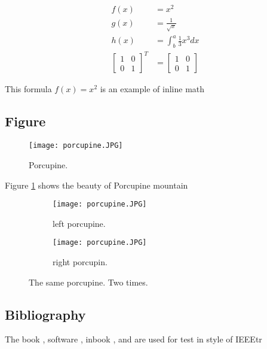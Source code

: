 \documentclass{article}
\begin{document}
\begin{align*}
    f(x) &= x^2 \\
    g(x) &= \frac{1}{\sqrt{x}} \\
    h(x) &= \int^a_b \frac{1}{3}x^3dx \\
    \left[\begin{matrix}
        1 & 0 \\
        0 & 1
    \end{matrix}\right]^T & =
    \left[\begin{matrix}
            1 & 0 \\
            0 & 1
          \end{matrix}\right]
\end{align*}

This formula $f(x) = x^2$ is an example of inline math


\subsection{Figure}
\begin{figure}
   \texttt{[image: porcupine.JPG]} 
   \caption{Porcupine.}
   \label{fig:porcupine}
\end{figure}
Figure \ref{fig:porcupine} shows the beauty of Porcupine mountain


\begin{figure}
    \centering
    \begin{subfigure}[b]{0.45\linewidth}
        \texttt{[image: porcupine.JPG]}
        \caption{left porcupine.}
    \end{subfigure}
    \begin{subfigure}[b]{0.45\linewidth}
        \texttt{[image: porcupine.JPG]}
        \caption{right porcupin.}
    \end{subfigure}
    \caption{The same porcupine. Two times.}
    \label{fig:subpocupine}
\end{figure}

\subsection{Bibliography}

The book \cite{DUMMY:1}, software \cite{Software:1}, inbook \cite{BOOK:2}, and
\cite{ARTICLE:1} are used for test in style of IEEEtr

\end{document}
